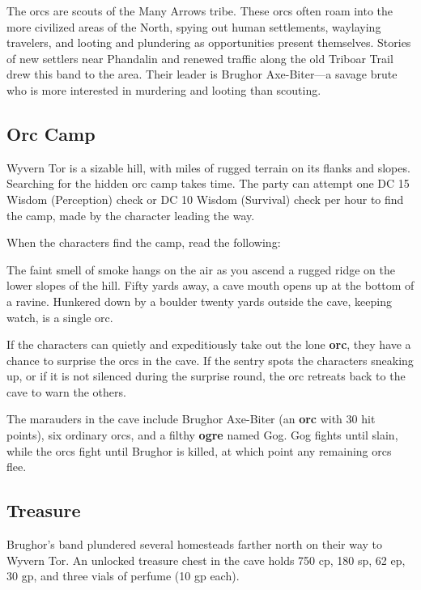 \documentclass[10pt,a4paper,twoside,bg=print,twocolumn,openany,nodeprecatedcode]{dndbook}
\begin{document}
The orcs are scouts of the Many Arrows tribe. These orcs often roam into the more civilized areas of the North, spying out human settlements, waylaying travelers, and looting and plundering as opportunities present themselves. Stories of new settlers near Phandalin and renewed traffic along the old Triboar Trail drew this band to the area. Their leader is Brughor Axe-Biter—a savage brute who is more interested in murdering and looting than scouting.

\subsection{Orc Camp}
Wyvern Tor is a sizable hill, with miles of rugged terrain on its flanks and slopes. Searching for the hidden orc camp takes time. The party can attempt one DC 15 Wisdom (Perception) check or DC 10 Wisdom (Survival) check per hour to find the camp, made by the character leading the way.

When the characters find the camp, read the following:

\begin{DndReadAloud}{}
The faint smell of smoke hangs on the air as you ascend a rugged ridge on the lower slopes of the hill. Fifty yards away, a cave mouth opens up at the bottom of a ravine. Hunkered down by a boulder twenty yards outside the cave, keeping watch, is a single orc.

\end{DndReadAloud}

If the characters can quietly and expeditiously take out the lone \textbf{orc}, they have a chance to surprise the orcs in the cave. If the sentry spots the characters sneaking up, or if it is not silenced during the surprise round, the orc retreats back to the cave to warn the others.

The marauders in the cave include Brughor Axe-Biter (an \textbf{orc} with 30 hit points), six ordinary orcs, and a filthy \textbf{ogre} named Gog. Gog fights until slain, while the orcs fight until Brughor is killed, at which point any remaining orcs flee.

\subsection{Treasure}
Brughor's band plundered several homesteads farther north on their way to Wyvern Tor. An unlocked treasure chest in the cave holds 750 cp, 180 sp, 62 ep, 30 gp, and three vials of perfume (10 gp each).
\end{document}
